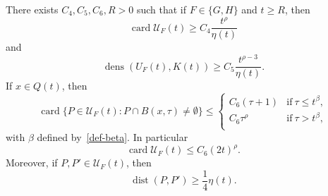 \documentclass[10pt,a4paper]{amsart}
\def\cU{\mathcal U}
\def\card{\operatorname{card}}
\def\dens{\operatorname{dens}}
\def\dist{\operatorname{dist}}
\begin{document}
\begin{lemma} \label{lemma3}
There exists $C_4,C_5,C_6,R>0$ such that if $F\in\{G,H\}$ and $t\geq R$, then
\begin{equation}\label{3h1}
\card \cU_F(t)
\geq C_4 \frac{t^{\rho}}{\eta(t)}
\end{equation}
and
\begin{equation}\label{3h2}
\dens\!\left(U_F(t),K(t)\right)
\geq C_5 \frac{t^{\rho-3}}{\eta(t)}.
\end{equation}
If  $x\in Q(t)$, then
\begin{equation}\label{3h3}
\card\{P\in  \cU_F(t)\colon P\cap B(x,\tau)\neq\emptyset\}
\leq
\begin{cases}
C_6(\tau +1) &\text{if}\ \tau\leq t^{\beta},\\
C_6\tau^\rho    &\text{if}\ \tau> t^{\beta},\\
\end{cases}
\end{equation}
with $\beta$ defined by~\eqref{def-beta}.
In particular 
\begin{equation}\label{eq3h3}
	\card \cU_F(t)\leq C_6(2t)^\rho.
\end{equation}
Moreover, if $P,P'\in \cU_F(t)$, then
\begin{equation}\label{3h4}
\dist(P,P')\geq\frac14 \eta(t).
\end{equation}
\end{lemma}
\end{document}
